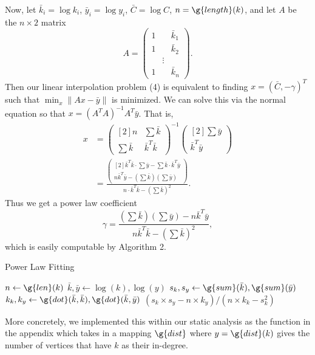\documentclass[11pt,a4paper,twocolumn]{article}
\begin{document}
\begin{singlespace}
Now, let $\bar{k}_i=\log k_i$, $\bar{y}_i=\log y_i$,
$\bar{C}=\log C$, $n=\g{length}(k)$, and let $A$ be the $n\times 2$ matrix
\[A=\begin{pmatrix}1&&\bar{k}_1\\ 1&&\bar{k}_2\\ &\vdots&\\ 1&&\bar{k}_n
\end{pmatrix}.\]
Then our linear interpolation problem (4) is equivalent to finding
$x=\left(\bar{C},-\gamma\right)^T$ such that $\min_x \|Ax-\bar{y}\|$ is
minimized. We can solve this via the normal equation \cite{mcomp} so that
$x=\left(A^T A\right)^{-1} A^T\bar{y}$. That is,
\begin{align*}x&=\begin{pmatrix}[2]n&\sum \bar{k}\\
\sum \bar{k} & \bar{k}^T\bar{k}\end{pmatrix}^{-1}
\begin{pmatrix}[2]\sum \bar{y}\\ \bar{k}^T\bar{y}\end{pmatrix}\\
&=\frac{
\begin{pmatrix}[2]\bar{k}^T\bar{k}\cdot\sum\bar{y}-\sum\bar{k}\cdot
\bar{k}^T\bar{y}\\ n\bar{k}^T\bar{y}-\left(\sum \bar{k}\right)
\left(\sum\bar{y}\right)\end{pmatrix}
}{n\cdot\bar{k}^T\bar{k}-\left(\sum \bar{k}\right)^2}.\end{align*}
Thus we get a power law coefficient
\begin{equation} \label{eq:gamma}
\gamma=\frac{\left(\sum\bar{k}\right)\left(\sum \bar{y}\right)
-n\bar{k}^T\bar{y}}{n\bar{k}^T\bar{k}-\left(\sum \bar{k}\right)^2},
\end{equation}
which is easily computable by Algorithm 2.
\begin{algorithm}
\caption{Power Law Fitting}
\begin{algorithmic}
\State $n \gets \g{len}(k)$
\State $\bar k, \bar y \gets \log(k), \log(y)$
\State $s_k, s_y \gets \g{sum}(\bar k), \g{sum}(\bar y)$
\State $k_k, k_y \gets \g{dot}(\bar k, \bar k), \g{dot}(\bar k, \bar y)$
\State \Return $(s_k \times s_y - n \times k_y)/(n \times k_k - s_k^2)$
\EndFunction
\end{algorithmic}
\end{algorithm}
More concretely, we implemented this within our static analysis as the function
 in the appendix which takes in a mapping $\g{dist}$ where
$y = \g{dist}(k)$ gives the
number of vertices that have $k$ as their in-degree.


\end{singlespace}
\end{document}
